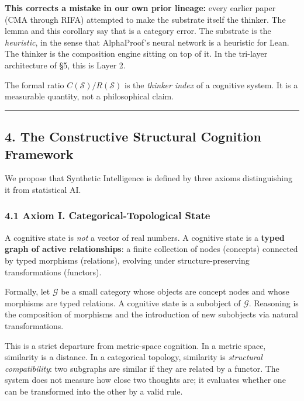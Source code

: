 \documentclass[
  11pt,
  a4paper,
]{article}
\begin{document}
\textbf{This corrects a mistake in our own prior lineage:} every earlier
paper (CMA through RIFA) attempted to make the substrate itself the
thinker. The lemma and this corollary say that is a category error. The
substrate is the \emph{heuristic}, in the sense that AlphaProof's neural
network is a heuristic for Lean. The thinker is the composition engine
sitting on top of it. In the tri-layer architecture of §5, this is Layer
2.

The formal ratio \(C(\mathcal{S})/R(\mathcal{S})\) is the \emph{thinker
index} of a cognitive system. It is a measurable quantity, not a
philosophical claim.

\begin{center}\rule{0.5\linewidth}{0.5pt}\end{center}

\subsection{4. The Constructive Structural Cognition
Framework}\label{the-constructive-structural-cognition-framework}

We propose that Synthetic Intelligence is defined by three axioms
distinguishing it from statistical AI.

\subsubsection{4.1 Axiom I. Categorical-Topological
State}\label{axiom-i.-categorical-topological-state}

A cognitive state is \emph{not} a vector of real numbers. A cognitive
state is a \textbf{typed graph of active relationships}: a finite
collection of nodes (concepts) connected by typed morphisms (relations),
evolving under structure-preserving transformations (functors).

Formally, let \(\mathcal{G}\) be a small category whose objects are
concept nodes and whose morphisms are typed relations. A cognitive state
is a subobject of \(\mathcal{G}\). Reasoning is the composition of
morphisms and the introduction of new subobjects via natural
transformations.

This is a strict departure from metric-space cognition. In a metric
space, similarity is a distance. In a categorical topology, similarity
is \emph{structural compatibility}: two subgraphs are similar if they
are related by a functor. The system does not measure how close two
thoughts are; it evaluates whether one can be transformed into the other
by a valid rule.
\end{document}
